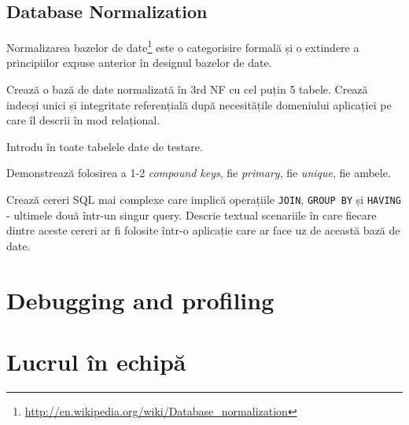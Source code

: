 \subsection{Database Normalization}
Normalizarea bazelor de date\footnote{\url{http://en.wikipedia.org/wiki/Database_normalization}}
este o categorisire formală și o 
extindere a principiilor expuse anterior în designul bazelor de date.


\begin{Exercise}[title={Database Normalization}]
Crează o bază de date normalizată în 3rd NF cu cel puțin 5 tabele. Crează indecși unici
și integritate referențială după necesitățile domeniului aplicației pe care îl
descrii în mod relațional.

Introdu în toate tabelele date de testare.

Demonstrează folosirea a 1-2 \textsl{compound keys}, fie \textsl{primary},
fie \textsl{unique}, fie ambele.

Crează cereri SQL mai complexe care implică operațiile \texttt{JOIN},
\texttt{GROUP BY} și \texttt{HAVING} - ultimele două într-un singur query.
Descrie textual scenariile în care fiecare dintre aceste cereri ar
fi folosite într-o aplicație care ar face uz de această bază de date.
\end{Exercise}

\section{Debugging and profiling}

\section{Lucrul în echipă}
% 
% 
% 


